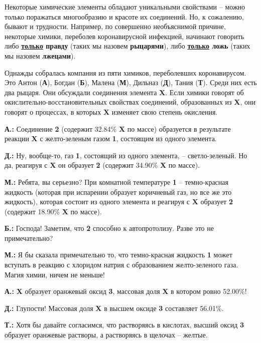 

Некоторые химические элементы обладают уникальными свойствами – можно только поражаться многообразию и красоте их соединений. Но, к сожалению, бывают и трудности. Например, по совершенно необъяснимой причине, некоторые химики, переболев коронавирусной инфекцией, начинают говорить либо \textbf{\underline{только} правду} (таких мы назовем \textbf{рыцарями}), либо \textbf{\underline{только} ложь} (таких мы назовем \textbf{лжецами}).

Однажды собралась компания из пяти химиков, переболевших коронавирусом. Это Антон (\textbf{А}), Богдан (\textbf{Б}), Малена (\textbf{М}), Дильназ (\textbf{Д}), Тания (\textbf{Т}). Среди них есть два рыцаря. Они обсуждали соединения элемента \textbf{X}. Если химики говорят об окислительно-восстановительных свойствах соединений, образованных из \textbf{X}, они говорят о процессах, в которых \textbf{X} изменяет свою степень окисления.

\textbf{А.:} Соединение \textbf{2} (содержит 32.84\% \textbf{X} по массе) образуется в результате реакции \textbf{X} с желто-зеленым газом \textbf{1}, состоящим из одного элемента.

\textbf{Д.:} Ну, вообще-то, газ \textbf{1}, состоящий из одного элемента, – светло-зеленый. Но да, реагируя с \textbf{X} он образует \textbf{2} (содержит 34.90\% \textbf{X} по массе).

\textbf{М.:} Ребята, вы серьезно? При комнатной температуре \textbf{1} – темно-красная жидкость (которая при испарении образует коричневый газ, но все же это жидкость), которая состоит из одного элемента и реагируя с \textbf{X} образует \textbf{2} (содержит 18.90\% \textbf{X} по массе).

\textbf{Б.:} Господа! Заметим, что \textbf{2} способно к автопротолизу. Разве это не примечательно?

\textbf{М.:} Я бы сказала примечательно то, что темно-красная жидкость \textbf{1} может вступать в реакцию с хлоридом натрия с образованием желто-зеленого газа. Магия химии, ничем не меньше!

\textbf{А.:} \textbf{X} образует оранжевый оксид \textbf{3}, массовая доля \textbf{X} в котором ровно 52.00\%!

\textbf{Д.:} Глупости! Массовая доля \textbf{X} в высшем оксиде \textbf{3} составляет 56.01\%.

\textbf{Т.:} Хотя бы давайте согласимся, что растворяясь в кислотах, высший оксид \textbf{3} образует оранжевые растворы, а растворяясь в щелочах – желтые.

